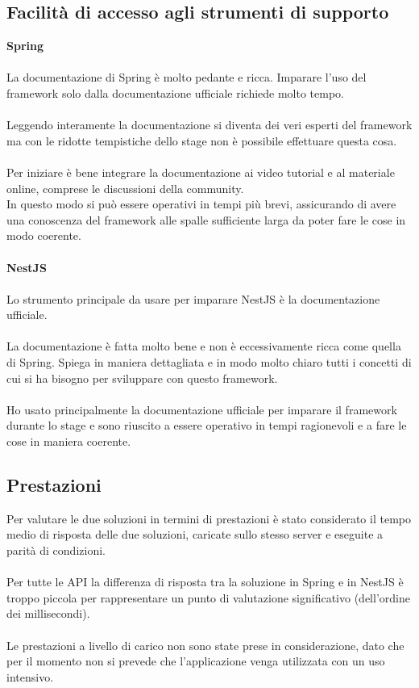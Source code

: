 \subsection{Facilità di accesso agli strumenti di supporto}
\textbf{Spring}
\\\\
La documentazione di Spring è molto pedante e ricca. Imparare l'uso del framework solo dalla documentazione 
ufficiale richiede molto tempo. 
\\\\
Leggendo interamente la documentazione si diventa dei veri esperti del framework ma con le ridotte tempistiche
dello stage non è possibile effettuare questa cosa.
\\\\
Per iniziare è bene integrare la documentazione ai video tutorial e al materiale online, comprese le discussioni 
della community. 
\\
In questo modo si può essere operativi in tempi più brevi, assicurando di avere una conoscenza
del framework alle spalle sufficiente larga da poter fare le cose in modo coerente.
\\\\
\textbf{NestJS}
\\\\
Lo strumento principale da usare per imparare NestJS è la documentazione ufficiale.
\\\\
La documentazione è fatta molto bene e non è eccessivamente ricca come quella di Spring. Spiega in maniera dettagliata
e in modo molto chiaro tutti i concetti di cui si ha bisogno per sviluppare con questo framework.
\\\\
Ho usato principalmente la documentazione ufficiale per imparare il framework durante lo stage e sono riuscito a essere
operativo in tempi ragionevoli e a fare le cose in maniera coerente.

\subsection{Prestazioni}
Per valutare le due soluzioni in termini di prestazioni è stato considerato il tempo medio di risposta delle due soluzioni, caricate sullo stesso 
server e eseguite a parità di condizioni.
\\\\
Per tutte le \gls{API} la differenza di risposta tra la soluzione in Spring e in NestJS è troppo piccola per rappresentare un punto
di valutazione significativo (dell'ordine dei millisecondi).
\\\\
Le prestazioni a livello di carico non sono state prese in considerazione, dato che per il momento non si prevede che l'applicazione 
venga utilizzata con un uso intensivo.
